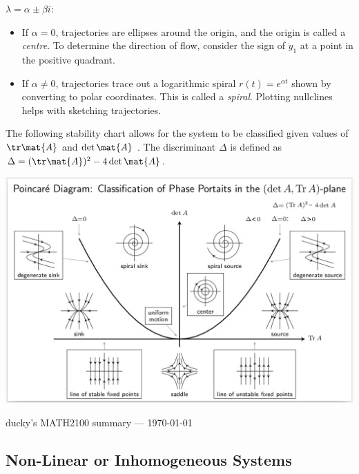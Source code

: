 \documentclass[10pt, a4paper]{article}
\begin{document}
\begin{landscape}
\begin{multicols}{2}
    \(\lambda = \alpha \pm \beta i\):
    \begin{itemize}
        \item If \(\alpha = 0\), trajectories are ellipses around the origin, and the origin
            is called a \emph{centre}. To determine the direction of flow, consider the sign of \(\dot y_1\)
            at a point in the positive quadrant.
        \item If \(\alpha \neq 0\), trajectories trace out a logarithmic spiral \(r(t) = e^{\alpha t}\)
            shown by converting to polar coordinates. This is called a \emph{spiral}.
            Plotting nullclines helps with sketching trajectories.
    \end{itemize}

    The following stability chart allows for the system to be classified given values of
    \(\tr \mat{A}\) and \(\det \mat{A}\) \cite{StabilityDiagram}. The discriminant
    \(\Delta\) is defined as \(\Delta = (\tr \mat{A})^2 - 4 \det \mat{A}\).

    {%
        \centering
        \includegraphics[width=\columnwidth]{images/stabilityDiagram.png}
    }%

    \begin{tcolorbox}[colframe=red!75!black, arc=0pt, outer arc=0pt, center, hbox]
        ducky's MATH2100 summary --- \today
    \end{tcolorbox}

\end{multicols}

\pagebreak

\begin{multicols}{2}
    \section{Non-Linear or Inhomogeneous Systems}


\end{multicols}
\end{landscape}
\end{document}
